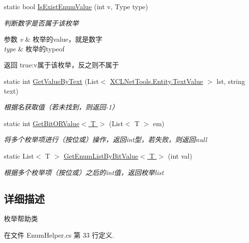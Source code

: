 \begin{DoxyCompactItemize}
static bool \hyperlink{class_x_c_l_net_tools_1_1_enum_1_1_enum_helper_a364b52512aee90c0f2530745f4127047}{Is\-Exist\-Enum\-Value} (int v, Type type)
\begin{DoxyCompactList}\small\item\em 判断数字是否属于该枚举 
\begin{DoxyParams}{参数}
{\em v} & 枚举的value，就是数字\\
\hline
{\em type} & 枚举的typeof\\
\hline
\end{DoxyParams}
\begin{DoxyReturn}{返回}
true\-:v属于该枚举，反之则不属于
\end{DoxyReturn}
\end{DoxyCompactList}\item 
static int \hyperlink{class_x_c_l_net_tools_1_1_enum_1_1_enum_helper_ab5d340064717d8cf3c9c6036d3770b1f}{Get\-Value\-By\-Text} (List$<$ \hyperlink{class_x_c_l_net_tools_1_1_entity_1_1_text_value}{X\-C\-L\-Net\-Tools.\-Entity.\-Text\-Value} $>$ lst, string text)
\begin{DoxyCompactList}\small\item\em 根据名获取值（若未找到，则返回-\/1） \end{DoxyCompactList}\item 
static int \hyperlink{class_x_c_l_net_tools_1_1_enum_1_1_enum_helper_a8ee641787655d2b4f06cb51486ea8be3}{Get\-Bit\-O\-R\-Value$<$ T $>$} (List$<$ T $>$ em)
\begin{DoxyCompactList}\small\item\em 将多个枚举项进行（按位或）操作，返回int型，若失败，则返回null \end{DoxyCompactList}\item 
static List$<$ T $>$ \hyperlink{class_x_c_l_net_tools_1_1_enum_1_1_enum_helper_a7023c3a9e2c46de0cdeed71bce2cfb6a}{Get\-Enum\-List\-By\-Bit\-Value$<$ T $>$} (int val)
\begin{DoxyCompactList}\small\item\em 根据多个枚举项（按位或）之后的int值，返回枚举list \end{DoxyCompactList}\end{DoxyCompactItemize}


\subsection{详细描述}
枚举帮助类 



在文件 Enum\-Helper.\-cs 第 33 行定义.



